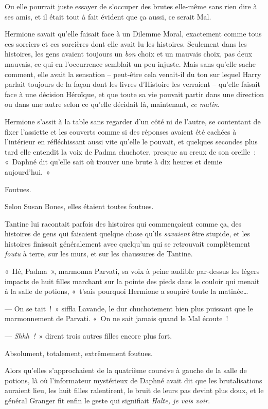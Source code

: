 Ou elle pourrait juste essayer de s'occuper des brutes elle-même sans rien dire à ses amis, et il était tout à fait évident que ça aussi, ce serait Mal.

Hermione savait qu'elle faisait face à un Dilemme Moral, exactement comme tous ces sorciers et ces sorcières dont elle avait lu les histoires.
Seulement dans les histoires, les gens avaient toujours un \emph{bon} choix et un mauvais choix, pas deux mauvais, ce qui en l'occurrence semblait un peu injuste.
Mais sans qu'elle sache comment, elle avait la sensation -- peut-être cela venait-il du ton sur lequel Harry parlait toujours de la façon dont les livres d'Histoire les verraient -- qu'elle faisait face à une décision Héroïque, et que toute sa vie pouvait partir dans une direction ou dans une autre selon ce qu'elle décidait là, maintenant, \emph{ce matin}.

Hermione s'assit à la table sans regarder d'un côté ni de l'autre, se contentant de fixer l'assiette et les couverts comme si des réponses avaient été cachées à l'intérieur en réfléchissant aussi vite qu'elle le pouvait, et quelques secondes plus tard elle entendit la voix de Padma chuchoter, presque au creux de son oreille~: «~Daphné dit qu'elle sait où trouver une brute à dix heures et demie aujourd'hui.~»

\later

Foutues.

Selon Susan Bones, elles étaient toutes foutues.

Tantine lui racontait parfois des histoires qui commençaient comme ça, des histoires de gens qui faisaient quelque chose qu'ils \emph{savaient} être stupide, et les histoires finissait généralement avec quelqu'un qui se retrouvait complètement \emph{foutu} à terre, sur les murs, et sur les chaussures de Tantine.

«~Hé, Padma~», marmonna Parvati, sa voix à peine audible par-dessus les légers impacts de huit filles marchant sur la pointe des pieds dans le couloir qui menait à la salle de potions, «~t'sais pourquoi Hermione a soupiré toute la matinée…

--- On se tait~!~»
siffla Lavande, le dur chuchotement bien plus puissant que le marmonnement de Parvati.
«~On ne sait jamais quand le Mal écoute~!

--- \emph{Shhh~!}~» dirent trois autres filles encore plus fort.

Absolument, totalement, extrêmement foutues.

Alors qu'elles s'approchaient de la quatrième coursive à gauche de la salle de potions, là où l'informateur mystérieux de Daphné avait dit que les brutalisations auraient lieu, les huit filles ralentirent, le bruit de leurs pas devint plus doux, et le général Granger fit enfin le geste qui signifiait \emph{Halte, je vais voir}.

